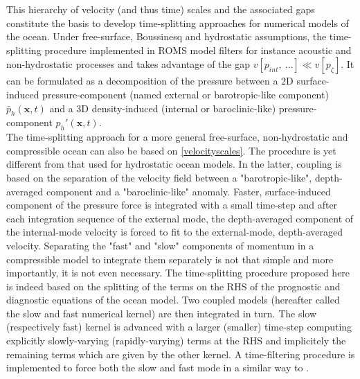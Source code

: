 This hierarchy of velocity (and thus time) scales and the associated gaps constitute the basis to develop time-splitting approaches for numerical models of the ocean.
Under free-surface, Boussinesq and hydrostatic assumptions, the time-splitting procedure implemented in ROMS model \citep{shchepetkin_regional_2005} filters for instance acoustic and non-hydrostatic processes and takes advantage of the gap $v[p_{int},\ ...] \ll v[p_\zeta]$. It can be formulated as a decomposition of the pressure between a 2D surface-induced pressure-component (named external or barotropic-like component) $\bar{p}_h(\mathbf{x},t)$ and a 3D density-induced (internal or baroclinic-like) pressure-component $p_h'(\mathbf{x},t)$. \\
The time-splitting approach for a more general free-surface, non-hydrostatic and compressible ocean can also be based on \ref{velocityscales}. The procedure is yet different from that used for hydrostatic ocean models. In the latter, coupling is based on the separation of the velocity field between a "barotropic-like", depth-averaged component and a "baroclinic-like" anomaly. Faster, surface-induced component of the pressure force is integrated with a small time-step and after each integration sequence of the external mode, the depth-averaged component of the internal-mode velocity is forced to fit to the external-mode, depth-averaged velocity. Separating the "fast" and "slow" components of momentum in a compressible model to integrate them separately is not that simple and more importantly, it is not even necessary. The time-splitting procedure proposed here is indeed based on the splitting of the terms on the RHS of the prognostic and diagnostic equations of the ocean model. Two coupled models (hereafter called the slow and fast numerical kernel) are then integrated in turn. The slow (respectively fast) kernel is advanced with a larger (smaller) time-step computing explicitly slowly-varying (rapidly-varying) terms at the RHS and implicitely the remaining terms which are given by the other kernel. A time-filtering procedure is implemented to force both the slow and fast mode in a similar way to \cite{shchepetkin_regional_2005}.


